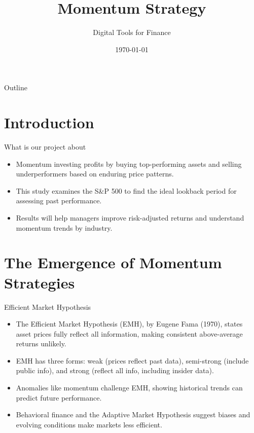 \documentclass{beamer}
\title{Momentum Strategy}
\author{Digital Tools for Finance}
\date{\today}
\begin{document}
\begin{frame}
    \titlepage
\end{frame}

\begin{frame}{Outline}
    \tableofcontents
\end{frame}

\section{Introduction}
\begin{frame}{What is our project about}
    
    \begin{itemize}
        \item Momentum investing profits by buying top-performing assets and selling underperformers based on enduring price patterns. 
        \item This study examines the S\&P 500 to find the ideal lookback period for assessing past performance.
        \item Results will help managers improve risk-adjusted returns and understand momentum trends by industry.
    \end{itemize}
\end{frame}

\section{The Emergence of Momentum Strategies}


\begin{frame}{Efficient Market Hypothesis}

    \begin{itemize}
        \item The Efficient Market Hypothesis (EMH), by Eugene Fama (1970), states asset prices fully reflect all information, making consistent above-average returns unlikely.
        \item EMH has three forms: weak (prices reflect past data), semi-strong (include public info), and strong (reflect all info, including insider data).
        \item Anomalies like momentum challenge EMH, showing historical trends can predict future performance.
        \item Behavioral finance and the Adaptive Market Hypothesis suggest biases and evolving conditions make markets less efficient.
    \end{itemize}
\end{frame}
\end{document}
